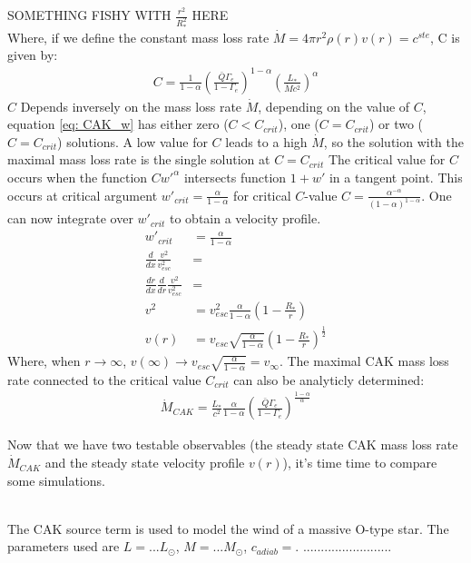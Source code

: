 SOMETHING FISHY WITH $\frac{r^2}{R_*^2}$ HERE\\

Where, if we define the constant mass loss rate $\dot{M} = 4\pi r^2 \rho(r) v(r) = c^{ste}$, C is given by:
\begin{align}
C = \frac{1}{1-\alpha} \left(\frac{\bar{Q}\Gamma_e}{1-\Gamma_e} \right)^{1-\alpha} \left(\frac{L_*}{\dot{M}c^2}\right)^\alpha
\end{align}
$C$ Depends inversely on the mass loss rate $\dot{M}$, depending on the value of $C$, equation \ref{eq: CAK_w} has either zero ($C < C_{crit}$), one ($C = C_{crit}$) or two ($C = C_{crit}$) solutions. A low value for $C$ leads to a high $\dot{M}$, so the solution with the maximal mass loss rate is the single solution at $C = C_{crit}$ The critical value for $C$ occurs when the function $C w'^\alpha$ intersects function $1 + w'$ in a tangent point. This occurs at critical argument $w'_{crit} = \frac{\alpha}{1-\alpha}$ for critical $C$-value $C = \frac{\alpha^{-\alpha}}{(1-\alpha)^{1-\alpha}}$. One can now integrate over $w'_{crit}$ to obtain a velocity profile.
\begin{align}
w'_{crit} &= \frac{\alpha}{1-\alpha} \\
\frac{d}{dx} \frac{v^2}{v_{esc}^2} &= \\
\frac{dr}{dx} \frac{d}{dr} \frac{v^2}{v_{esc}^2} &= \\
v^2 &= v_{esc}^2 \frac{\alpha}{1-\alpha} \left(1 - \frac{R_*}{r} \right) \\
v(r) &= v_{esc} \sqrt{\frac{\alpha}{1-\alpha}} \left(1 - \frac{R_*}{r} \right)^\frac{1}{2}
\end{align}
Where, when $r\rightarrow\infty$, $v(\infty) \rightarrow v_{esc} \sqrt{\frac{\alpha}{1-\alpha}} = v_\infty$. The maximal CAK mass loss rate connected to the critical value $C_{crit}$ can also be analyticly determined:
\begin{align}
\dot{M}_{CAK} = \frac{L_*}{c^2} \frac{\alpha}{1-\alpha}\left(\frac{\bar{Q}\Gamma_e}{1-\Gamma_e}\right)^{\frac{1-\alpha}{\alpha}}
\end{align}

Now that we have two testable observables (the steady state CAK mass loss rate $\dot{M}_{CAK}$ and the steady state velocity profile $v(r)$), it's time time to compare some simulations.\\\

The CAK source term is used to model the wind of a massive O-type star. The parameters used are $L = ... L_\odot$, $M = ... M_\odot$, $c_{adiab} =$. ......................... \\


